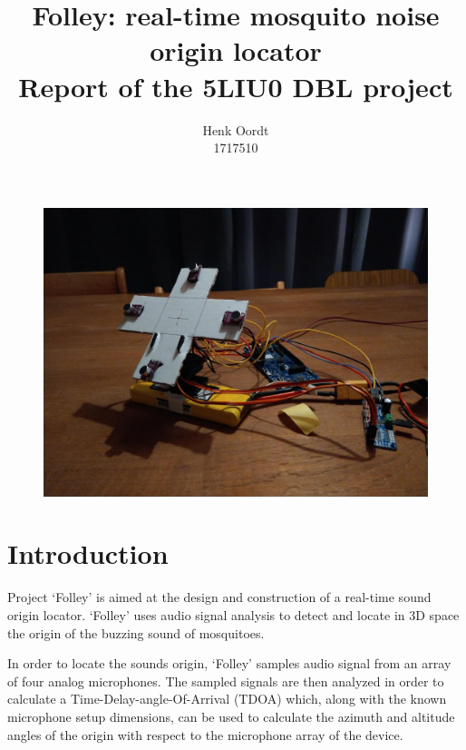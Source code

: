 \documentclass[a4paper]{article}
\begin{document}
\title{{Folley: real-time mosquito noise origin locator} \\\large {Report of the 5LIU0 DBL project}}
\author{{Henk Oordt} \hfill
\\
{1717510} \hfill}
\maketitle
\begin{figure}[H]
    \begin{center}
        \includegraphics[width=\linewidth]{assets/device.jpeg}
    \end{center}
\end{figure}


\newpage

\section{Introduction}
Project `Folley' is aimed at the design and construction of a real-time sound origin locator. `Folley' uses audio signal analysis to detect and locate in 3D space the origin of the buzzing sound of mosquitoes.

In order to locate the sounds origin, `Folley' samples audio signal from an array of four analog microphones. The sampled signals are then analyzed in order to calculate a Time-Delay-angle-Of-Arrival (TDOA) \cite{6327613} which, along with the known microphone setup dimensions, can be used to calculate the azimuth and altitude angles of the origin with respect to the microphone array of the device.
\end{document}
